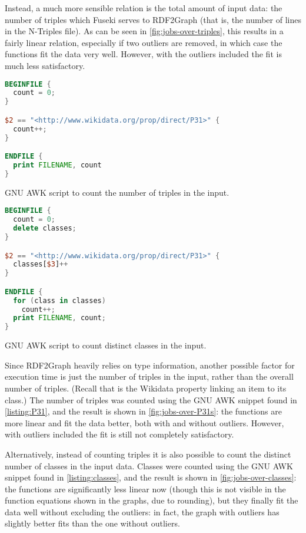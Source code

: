 Instead, a much more sensible relation is the total amount of input data:
the number of triples which Fuseki serves to RDF2Graph
(that is, the number of lines in the N-Triples file). %
As can be seen in \cref{fig:jobs-over-triples},
this results in a fairly linear relation,
especially if two outliers are removed,
in which case the functions fit the data very well.
However, with the outliers included the fit is much less satisfactory.

\begin{lstfloat}[b]
\begin{lstlisting}[language=awk]
BEGINFILE {
  count = 0;
}

$2 == "<http://www.wikidata.org/prop/direct/P31>" {
  count++;
}

ENDFILE {
  print FILENAME, count
}
\end{lstlisting}
\caption{GNU AWK script to count the number of  triples in the input.}
\label{listing:P31}
\end{lstfloat}

\begin{lstfloat}[b]
\begin{lstlisting}[language=awk]
BEGINFILE {
  count = 0;
  delete classes;
}

$2 == "<http://www.wikidata.org/prop/direct/P31>" {
  classes[$3]++
}

ENDFILE {
  for (class in classes)
    count++;
  print FILENAME, count;
}
\end{lstlisting}
\caption{GNU AWK script to count distinct classes in the input.}
\label{listing:classes}
\end{lstfloat}

Since RDF2Graph heavily relies on type information,
another possible factor for execution time
is just the number of  triples in the input,
rather than the overall number of triples.
(Recall that  is the Wikidata property linking an item to its class.)
The number of  triples was counted
using the GNU AWK snippet found in \cref{listing:P31},
and the result is shown in \cref{fig:jobs-over-P31s}:
the functions are more linear and fit the data better, both with and without outliers.
However, with outliers included the fit is still not completely satisfactory.

Alternatively, instead of counting  triples
it is also possible to count the distinct number of classes in the input data.
Classes were counted using the GNU AWK snippet found in \cref{listing:classes},
and the result is shown in \cref{fig:jobs-over-classes}:
the functions are significantly less linear now
(though this is not visible in the function equations shown in the graphs, due to rounding),
but they finally fit the data well without excluding the outliers:
in fact, the graph with outliers has slightly better fits than the one without outliers.

